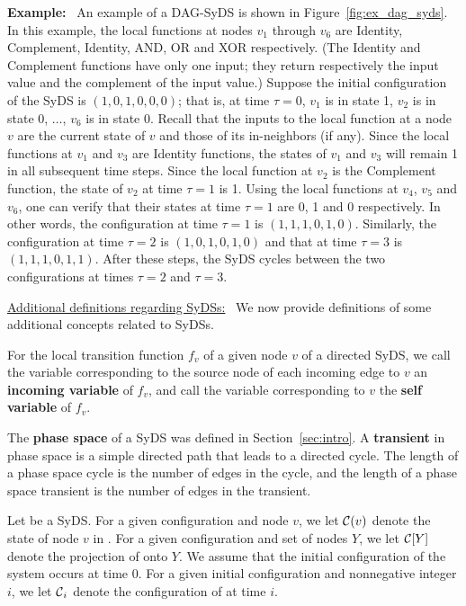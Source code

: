 \noindent
\textbf{Example:}~ An example of a DAG-SyDS is shown in
Figure~\ref{fig:ex_dag_syds}.
In this example, the local functions at nodes $v_1$ through
$v_6$ are Identity, Complement, Identity, AND, OR and
XOR respectively.
(The Identity and Complement functions have only one input;
they return respectively the input value and the complement of
the input value.)
Suppose the initial configuration of the SyDS is $(1, 0, 1, 0, 0, 0)$;
that is, at time $\tau = 0$, $v_1$ is in state 1, 
$v_2$ is in state 0, $\ldots$, $v_6$ is in state 0.
Recall that the inputs to the local function at a node $v$ are the current
state of $v$ and those of its in-neighbors (if any).
Since the local functions at $v_1$ and $v_3$ are Identity functions,
the states of $v_1$ and $v_3$ will remain 1 in all subsequent time steps.
Since the local function at $v_2$ is the Complement function, the state of
$v_2$ at time $\tau = 1$ is 1.
Using the local functions at $v_4$, $v_5$ and $v_6$, one can verify that
their states at time $\tau = 1$ are 0, 1 and 0 respectively.
In other words, the configuration at time $\tau = 1$ is 
$(1, 1, 1, 0, 1, 0)$.
Similarly, the configuration at time $\tau = 2$ is $(1, 0, 1, 0, 1, 0)$
and that at time $\tau = 3$ is $(1, 1, 1, 0, 1, 1)$.
After these steps, the SyDS cycles between the two configurations
at times $\tau =2$ and $\tau = 3$.

\smallskip
\noindent
\underline{\textsf{Additional definitions regarding SyDSs:}}~
We now provide definitions of some additional concepts
related to SyDSs.

\begin{definition}\label{def:variable_typesl}
For the local transition function $f_v$ of a given node $v$ of a directed  SyDS,
we call the variable corresponding to the source node 
of each incoming edge to $v$ an {\bf incoming variable} of $f_v$,
and call the variable corresponding to $v$ the  {\bf self variable} of $f_v$.
\end{definition}

The \textbf{phase space} of a SyDS was defined in Section~\ref{sec:intro}.
A \textbf{transient} in phase space is a simple directed path that
leads to a directed cycle.
The length of a phase space cycle is the number of edges in the cycle,
and the length of a phase space transient is the number of edges in the transient.

Let \cals{} be a SyDS.
For a given configuration \calc{} and node $v$,
we let $\mbox{$\mathcal{C}$}(v)$ denote the state of node $v$ in \calc{}.
For a given configuration \calc{} and set of nodes $Y$,
we let $\mbox{$\mathcal{C}$}[Y]$ denote the projection of \calc{} onto $Y$.
We assume that the initial configuration of the system 
occurs at time 0.
For a given initial configuration \calc{} and nonnegative integer $i$,
we let $\mbox{$\mathcal{C}$}_i$ denote the configuration of \cals{} at time $i$.

